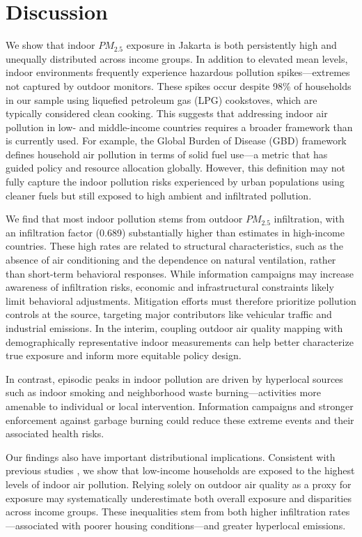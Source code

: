 \documentclass[reqno,12pt,notitlepage]{article}
\begin{document}
\section{Discussion}

We show that indoor $PM_{2.5}$ exposure in Jakarta is both persistently high and unequally distributed across income groups. In addition to elevated mean levels, indoor environments frequently experience hazardous pollution spikes—extremes not captured by outdoor monitors. These spikes occur despite 98\% of households in our sample using liquefied petroleum gas (LPG) cookstoves, which are typically considered clean cooking. This suggests that addressing indoor air pollution in low- and middle-income countries requires a broader framework than is currently used.
For example, the Global Burden of Disease (GBD) framework defines household air pollution in terms of solid fuel use—a metric that has guided policy and resource allocation globally. However, this definition may not fully capture the indoor pollution risks experienced by urban populations using cleaner fuels but still exposed to high ambient and infiltrated pollution. 

We find that most indoor pollution stems from outdoor $PM_{2.5}$ infiltration, with an infiltration factor (0.689) substantially higher than estimates in high-income countries. These high rates are related to structural characteristics, such as the absence of air conditioning and the dependence on natural ventilation, rather than short-term behavioral responses. While information campaigns may increase awareness of infiltration risks, economic and infrastructural constraints likely limit behavioral adjustments. Mitigation efforts must therefore prioritize  pollution controls at the source, targeting major contributors like vehicular traffic and industrial emissions. In the interim, coupling outdoor air quality mapping with demographically representative indoor measurements can help better characterize true exposure and inform more equitable policy design.


In contrast, episodic peaks in indoor pollution are driven by hyperlocal sources such as indoor smoking and neighborhood waste burning—activities more amenable to individual or local intervention. Information campaigns and stronger enforcement against garbage burning could reduce these extreme events and their associated health risks.


Our findings also have important distributional implications. Consistent with previous studies \citep{greenstone_indoor_2021, burke_exposures_2022, ito_willingness_2020}, we show that low-income households are exposed to the highest levels of indoor air pollution. Relying solely on outdoor air quality as a proxy for exposure may systematically underestimate both overall exposure and disparities across income groups. These inequalities stem from both higher infiltration rates—associated with poorer housing conditions—and greater hyperlocal emissions. 
\end{document}
